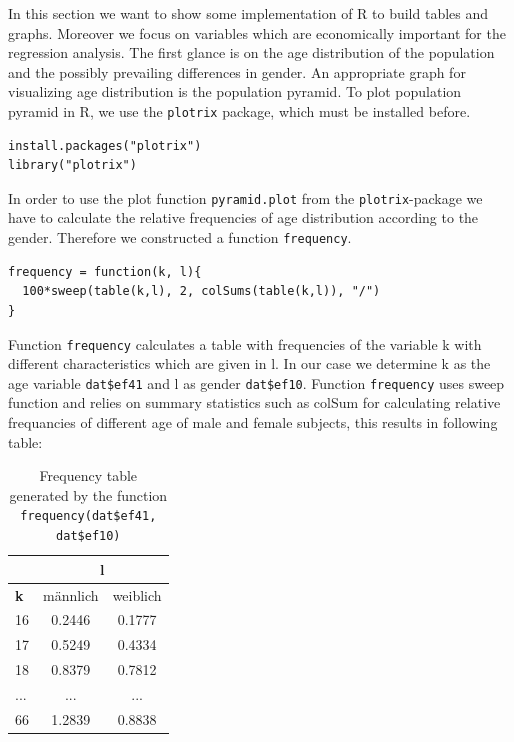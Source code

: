 In this section we want to show some implementation of R to build tables and graphs. Moreover we focus on variables which are economically important for the regression analysis. The first glance is on the age distribution of the population and the possibly prevailing differences in gender. An appropriate graph for visualizing age distribution is the population pyramid. To plot population pyramid in R, we use the \texttt{plotrix} package, which must be installed before.
\lstset{firstnumber = 157}
\begin{lstlisting}
install.packages("plotrix")
library("plotrix")
\end{lstlisting}
In order to use the plot function \texttt{pyramid.plot} from the \texttt{plotrix}-package we have to calculate the relative frequencies of age distribution according to the gender. Therefore we constructed a function \texttt{frequency}.
\lstset{firstnumber = 161}
\begin{lstlisting}
frequency = function(k, l){
  100*sweep(table(k,l), 2, colSums(table(k,l)), "/")
}
\end{lstlisting}
Function \texttt{frequency} calculates a table with frequencies of the variable k with different characteristics which are given in l. In our case we determine k as the age variable \texttt{dat\$ef41} and l as gender \texttt{dat\$ef10}. Function \texttt{frequency} uses sweep function and relies on summary statistics such as colSum for calculating relative frequancies of different age of male and female subjects, this results in following table:
\begin{table}[h!]
\centering
\caption{Frequency table generated by the function \texttt{frequency(dat\$ef41, dat\$ef10)}}
\label{freq}
\begin{tabular}{l|c|c|}
\cline{2-3}
                                 & \multicolumn{2}{c|}{\textbf{l}} \\ \hline
\multicolumn{1}{|l|}{\textbf{k}} & männlich       & weiblich       \\ \hline
\multicolumn{1}{|l|}{16}         & 0.2446         & 0.1777         \\ \hline
\multicolumn{1}{|l|}{17}         & 0.5249         & 0.4334         \\ \hline
\multicolumn{1}{|l|}{18}         & 0.8379         & 0.7812         \\ \hline
\multicolumn{1}{|l|}{...}        & ...            & ...            \\ \hline
\multicolumn{1}{|l|}{66}         & 1.2839         & 0.8838         \\ \hline
\end{tabular}
\end{table}

